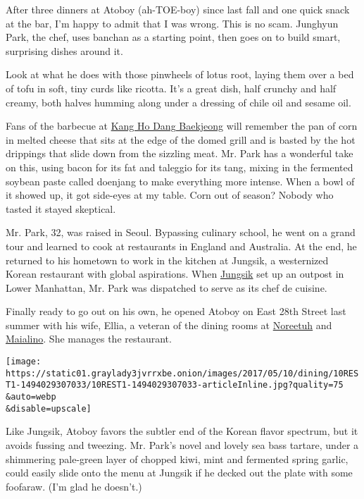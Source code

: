 After three dinners at Atoboy (ah-TOE-boy) since last fall and one quick
snack at the bar, I'm happy to admit that I was wrong. This is no scam.
Junghyun Park, the chef, uses banchan as a starting point, then goes on
to build smart, surprising dishes around it.

Look at what he does with those pinwheels of lotus root, laying them
over a bed of tofu in soft, tiny curds like ricotta. It's a great dish,
half crunchy and half creamy, both halves humming along under a dressing
of chile oil and sesame oil.

Fans of the barbecue at
\href{https://www.nytimes3xbfgragh.onion/2014/12/17/dining/critics-notebook-pete-wells-explores-korean-restaurants-in-queens.html?_r=0}{Kang
Ho Dang Baekjeong} will remember the pan of corn in melted cheese that
sits at the edge of the domed grill and is basted by the hot drippings
that slide down from the sizzling meat. Mr. Park has a wonderful take on
this, using bacon for its fat and taleggio for its tang, mixing in the
fermented soybean paste called doenjang to make everything more intense.
When a bowl of it showed up, it got side-eyes at my table. Corn out of
season? Nobody who tasted it stayed skeptical.

Mr. Park, 32, was raised in Seoul. Bypassing culinary school, he went on
a grand tour and learned to cook at restaurants in England and
Australia. At the end, he returned to his hometown to work in the
kitchen at Jungsik, a westernized Korean restaurant with global
aspirations. When
\href{http://www.nytimes3xbfgragh.onion/2012/02/29/dining/reviews/jungsik-intribeca-reinterprets-korean-cuisine.html}{Jungsik}
set up an outpost in Lower Manhattan, Mr. Park was dispatched to serve
as its chef de cuisine.

Finally ready to go out on his own, he opened Atoboy on East 28th Street
last summer with his wife, Ellia, a veteran of the dining rooms at
\href{https://www.nytimes3xbfgragh.onion/2015/06/24/dining/restaurant-reviews-noreetuh-the-eddy-in-the-east-village.html}{Noreetuh}
and
\href{http://www.nytimes3xbfgragh.onion/2010/01/20/dining/reviews/20rest.html}{Maialino}.
She manages the restaurant.

\texttt{[image: https://static01.graylady3jvrrxbe.onion/images/2017/05/10/dining/10REST1-1494029307033/10REST1-1494029307033-articleInline.jpg?quality=75\\\&auto=webp\\\&disable=upscale]}

Like Jungsik, Atoboy favors the subtler end of the Korean flavor
spectrum, but it avoids fussing and tweezing. Mr. Park's novel and
lovely sea bass tartare, under a shimmering pale-green layer of chopped
kiwi, mint and fermented spring garlic, could easily slide onto the menu
at Jungsik if he decked out the plate with some foofaraw. (I'm glad he
doesn't.)

